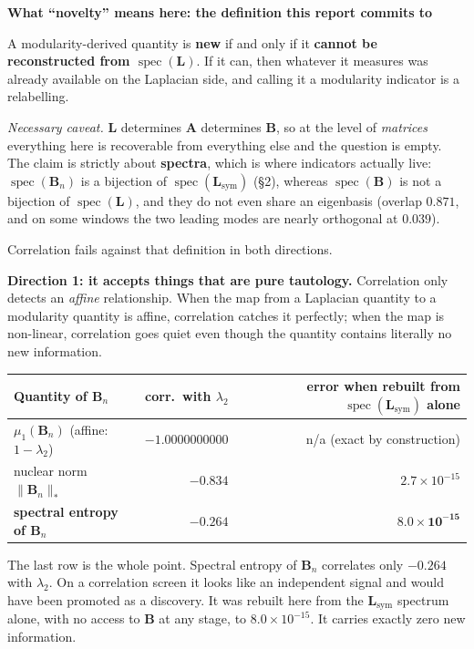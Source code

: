 \documentclass[11pt,a4paper]{article}
\newcommand{\Lap}{\mathbf{L}}
\newcommand{\Amat}{\mathbf{A}}
\newcommand{\Bmat}{\mathbf{B}}
\newcommand{\Lsym}{\Lap_{\mathrm{sym}}}
\newcommand{\Bn}{\Bmat_{n}}
\newenvironment{aside}[1]
 {\par\vspace{2.5mm}\begin{lrbox}{\asidebox}%
  \begin{minipage}{\dimexpr\textwidth-16pt\relax}\small\textbf{#1}\par\vspace{1mm}}
 {\end{minipage}\end{lrbox}%
  \noindent\setlength{\fboxsep}{7pt}\setlength{\fboxrule}{.4pt}%
  \fcolorbox{Rule}{Panel2}{\usebox{\asidebox}}\par\vspace{2.5mm}}
\begin{document}
\begin{aside}{What ``novelty'' means here: the definition this report commits to}
A modularity-derived quantity is \textbf{new} if and only if it \textbf{cannot be
reconstructed from $\operatorname{spec}(\Lap)$}. If it can, then whatever it
measures was already available on the Laplacian side, and calling it a modularity
indicator is a relabelling.

\smallskip
\emph{Necessary caveat.} $\Lap$ determines $\Amat$ determines $\Bmat$, so at the
level of \emph{matrices} everything here is recoverable from everything else and
the question is empty. The claim is strictly about \textbf{spectra}, which is where
indicators actually live: $\operatorname{spec}(\Bn)$ is a bijection of
$\operatorname{spec}(\Lsym)$ (\S2), whereas $\operatorname{spec}(\Bmat)$ is not a
bijection of $\operatorname{spec}(\Lap)$, and they do not even share an eigenbasis
(overlap $0.871$, and on some windows the two leading modes are nearly orthogonal
at $0.039$).
\end{aside}

Correlation fails against that definition in both directions.

\medskip
\noindent\textbf{Direction 1: it accepts things that are pure tautology.}
Correlation only detects an \emph{affine} relationship. When the map from a
Laplacian quantity to a modularity quantity is affine, correlation catches it
perfectly; when the map is non-linear, correlation goes quiet even though the
quantity contains literally no new information.

\begin{center}\small
\renewcommand{\arraystretch}{1.2}
\begin{tabular}{@{}lrr@{}}
\toprule
\textbf{Quantity of $\Bn$} & \textbf{corr.\ with $\lambda_2$} &
\textbf{error when rebuilt from $\operatorname{spec}(\Lsym)$ alone} \\
\midrule
$\mu_1(\Bn)$ \quad\small(affine: $1-\lambda_2$) & $-1.0000000000$ & n/a (exact by construction) \\
nuclear norm $\|\Bn\|_*$ & $-0.834$ & $2.7\times10^{-15}$ \\
\textbf{spectral entropy of $\Bn$} & $\mathbf{-0.264}$ & $\mathbf{8.0\times10^{-15}}$ \\
\bottomrule
\end{tabular}
\end{center}

The last row is the whole point. Spectral entropy of $\Bn$ correlates only
$-0.264$ with $\lambda_2$. On a correlation screen it looks like an independent
signal and would have been promoted as a discovery. It was rebuilt here from the
$\Lsym$ spectrum alone, with no access to $\Bmat$ at any stage, to
$8.0\times10^{-15}$. It carries exactly zero new information.
\end{document}
